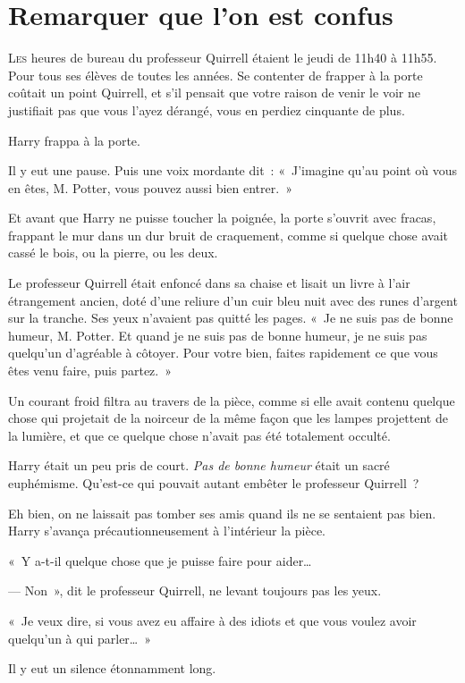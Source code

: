 \chapter{Remarquer que l'on est confus}

\lettrine{L}{es} heures de bureau du professeur Quirrell étaient le jeudi de 11h40 à 11h55.
Pour tous ses élèves de toutes les années.
Se contenter de frapper à la porte coûtait un point Quirrell, et s'il pensait que votre raison de venir le voir ne justifiait pas que vous l'ayez dérangé, vous en perdiez cinquante de plus.

Harry frappa à la porte.

Il y eut une pause.
Puis une voix mordante dit~: «~J'imagine qu'au point où vous en êtes, M. Potter, vous pouvez aussi bien entrer.~»

Et avant que Harry ne puisse toucher la poignée, la porte s'ouvrit avec fracas, frappant le mur dans un dur bruit de craquement, comme si quelque chose avait cassé le bois, ou la pierre, ou les deux.

Le professeur Quirrell était enfoncé dans sa chaise et lisait un livre à l'air étrangement ancien, doté d'une reliure d'un cuir bleu nuit avec des runes d'argent sur la tranche.
Ses yeux n'avaient pas quitté les pages.
«~Je ne suis pas de bonne humeur, M. Potter.
Et quand je ne suis pas de bonne humeur, je ne suis pas quelqu'un d'agréable à côtoyer.
Pour votre bien, faites rapidement ce que vous êtes venu faire, puis partez.~»

Un courant froid filtra au travers de la pièce, comme si elle avait contenu quelque chose qui projetait de la noirceur de la même façon que les lampes projettent de la lumière, et que ce quelque chose n'avait pas été totalement occulté.

Harry était un peu pris de court.
\emph{Pas de bonne humeur} était un sacré euphémisme.
Qu'est-ce qui pouvait autant embêter le professeur Quirrell~?

Eh bien, on ne laissait pas tomber ses amis quand ils ne se sentaient pas bien.
Harry s'avança précautionneusement à l'intérieur la pièce.

«~Y a-t-il quelque chose que je puisse faire pour aider…

--- Non~», dit le professeur Quirrell, ne levant toujours pas les yeux.

«~Je veux dire, si vous avez eu affaire à des idiots et que vous voulez avoir quelqu'un à qui parler…~»

Il y eut un silence étonnamment long.

